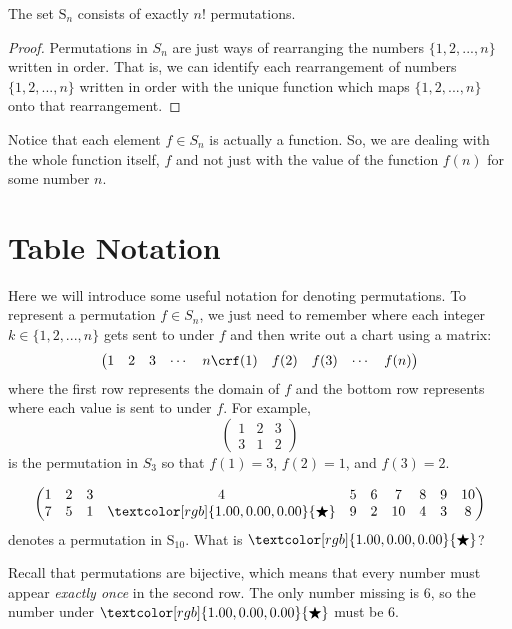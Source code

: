 \documentclass[11pt,dvipsnames]{book}
\numberwithin{figure}{section} %
\numberwithin{table}{section} %
\begin{document}
\begin{lemma}%
 The set $\mathrm{S}_n$ consists of exactly $n!$ permutations.
\end{lemma}
\begin{proof}
Permutations in $S_{n}$ are just ways of rearranging the numbers $\{1,2,...,n\}$ written in order. That is, we can identify each rearrangement of numbers $\{1,2,...,n\}$ written in order with the unique function which maps $\{1,2,...,n\}$ onto that rearrangement. 
\end{proof}

Notice that each element $f\in S_{n}$ is actually a function.
So, we are dealing with the whole function itself, \(f\) and not just with the value of the function \(f(n)\) for some number \(n\).

\section{Table Notation}

Here we will introduce some useful notation for denoting permutations. To represent a permutation $f\in S_n$,  we just need to remember where each integer $k\in \{1,2,...,n\}$ gets sent to under $f$ and then write out a chart using a matrix:
 $$
\left(\begin{matrix} %
1 & 2 & 3 & \cdots & n \cr%
f(1) & f(2) & f(3) & \cdots & f(n) \cr%
\end{matrix}\right)
$$
where the first row represents the domain of $f$ and the bottom row represents where each value is sent to under $f$. For example,
 $$
\left(\begin{matrix} %
1 & 2 & 3  \\
3 & 1 & 2
\end{matrix}\right)
$$
is the permutation in $S_{3}$ so that $f(1)=3$, $f(2)=1$, and $f(3)=2$. 

\begin{exercise}
$$
\left(\begin{matrix} %
1 & 2 & 3 & 4 & 5 & 6 & 7  & 8 & 9 & 10 \cr%
7 & 5 & 1 & \textcolor[rgb]{1.00,0.00,0.00}{\bigstar} & 9 & 2 & 10 & 4 & 3 & 8\cr%
\end{matrix}\right)
$$
denotes a permutation in $\mathrm{S}_{10}$.  What is
$\textcolor[rgb]{1.00,0.00,0.00}{\bigstar}$?

\begin{solution}
Recall that permutations are bijective, which means that every number must appear \emph{exactly once} in the second row. The only number missing is $6$, so the number under $\textcolor[rgb]{1.00,0.00,0.00}{\bigstar}$ must be 6. 
\end{solution}
\end{exercise}
\end{document}
